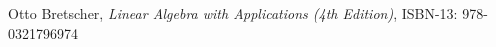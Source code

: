 \newpage
\begin{thebibliography}{8}
    Otto Bretscher, \emph{Linear Algebra with Applications (4th Edition)},
        ISBN-13: 978-0321796974
\end{thebibliography}
